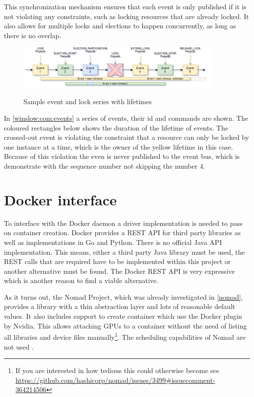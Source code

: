 This synchronization mechanism ensures that each event is only published if it is not violating any constraints, such as locking resources that are already locked.
It also allows for multiple locks and elections to happen concurrently, as long as there is no overlap.

\begin{figure}[H]
	\centering
	\includegraphics[width=0.9\textwidth]{events.png}
	\label{winslow:com:events}
	\caption{Sample event and lock series with lifetimes}
\end{figure}

In \autoref{winslow:com:events} a series of events, their id and commands are shown.
The coloured rectangles below shows the duration of the lifetime of events.
The crossed-out event is violating the constraint that a resource can only be locked by one instance at a time, which is the owner of the yellow lifetime in this case.
Because of this violation the even is never published to the event bus, which is demonstrate with the sequence number not skipping the number 4.

\section{Docker interface}

To interface with the Docker daemon a driver implementation is needed to pass on container creation.
Docker provides a REST API\cite{docker:api} for third party libraries as well as implementations in Go and Python.
There is no official Java API implementation.
This means, either a third party Java library must be used, the REST calls that are required have to be implemented within this project or another alternative must be found.
The Docker REST API is very expressive which is another reason to find a viable alternative.

As it turns out, the Nomad Project, which was already investigated in \autoref{nomad}, provides a library with a thin abstraction layer and lots of reasonable default values.
It also includes support to create container which use the Docker plugin by Nvidia\cite{nvidia:docker_plugin}.
This allows attaching GPUs to a container without the need of listing all libraries and device files manually\footnote{If you are interested in how tedious this could otherwise become see \url{https://github.com/hashicorp/nomad/issues/3499\#issuecomment-364214506}}.
The scheduling capabilities of Nomad are not used .


